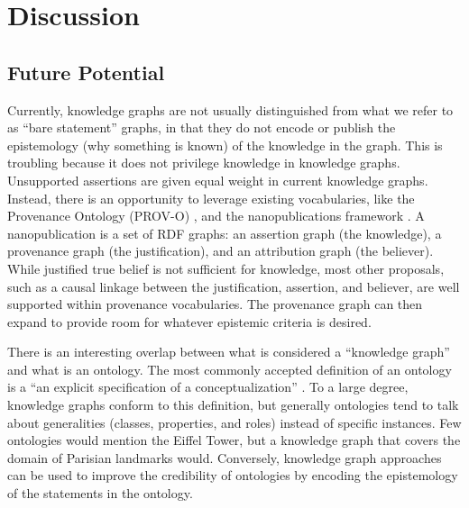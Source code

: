 \section{Discussion}


\subsection{Future Potential}

Currently, knowledge graphs are not usually distinguished from what we refer to as ``bare statement'' graphs, in that they do not encode or publish the epistemology (why something is known) of the knowledge in the graph.
This is troubling because it does not privilege knowledge in knowledge graphs.
Unsupported assertions are given equal weight in current knowledge graphs.
Instead, there is an opportunity to leverage existing vocabularies, like the Provenance Ontology (PROV-O) \cite{Moreau_2015}, and the nanopublications framework \cite{groth2010anatomy}.
A nanopublication is a set of RDF graphs: an assertion graph (the knowledge), a provenance graph (the justification), and an attribution graph (the believer).
While justified true belief is not sufficient for knowledge, most other proposals, such as a causal linkage between the justification, assertion, and believer, are well supported within provenance vocabularies.
The provenance graph can then expand to provide room for whatever epistemic criteria is desired.

There is an interesting overlap between what is considered a ``knowledge graph'' and what is an ontology.
The most commonly accepted definition of an ontology is a ``an explicit specification of a conceptualization'' \cite{Gruber_1993}.
To a large degree, knowledge graphs conform to this definition, but generally ontologies tend to talk about generalities (classes, properties, and roles) instead of specific instances.
Few ontologies would mention the Eiffel Tower, but a knowledge graph that covers the domain of Parisian landmarks would.
Conversely, knowledge graph approaches can be used to improve the credibility of ontologies by encoding the epistemology of the statements in the ontology.
